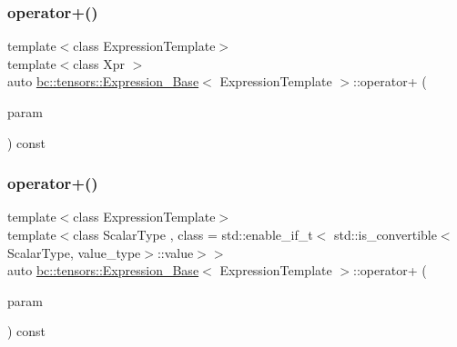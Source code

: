 \subsubsection{\texorpdfstring{operator+()}{operator+()}\hspace{0.1cm}{\footnotesize\ttfamily [1/2]}}
{\footnotesize\ttfamily template$<$class Expression\+Template$>$ \\
template$<$class Xpr $>$ \\
auto \hyperlink{classbc_1_1tensors_1_1Expression__Base}{bc\+::tensors\+::\+Expression\+\_\+\+Base}$<$ Expression\+Template $>$\+::operator+ (\begin{DoxyParamCaption}\item[{const \hyperlink{classbc_1_1tensors_1_1Expression__Base}{Expression\+\_\+\+Base}$<$ Xpr $>$ \&}]{param }\end{DoxyParamCaption}) const\hspace{0.3cm}{\ttfamily [inline]}}

\mbox{\label{classbc_1_1tensors_1_1Expression__Base_a2b29585ec1eab54f5406da087ba5565c}} 
\subsubsection{\texorpdfstring{operator+()}{operator+()}\hspace{0.1cm}{\footnotesize\ttfamily [2/2]}}
{\footnotesize\ttfamily template$<$class Expression\+Template$>$ \\
template$<$class Scalar\+Type , class  = std\+::enable\+\_\+if\+\_\+t$<$   std\+::is\+\_\+convertible$<$\+Scalar\+Type, value\+\_\+type$>$\+::value$>$$>$ \\
auto \hyperlink{classbc_1_1tensors_1_1Expression__Base}{bc\+::tensors\+::\+Expression\+\_\+\+Base}$<$ Expression\+Template $>$\+::operator+ (\begin{DoxyParamCaption}\item[{const Scalar\+Type \&}]{param }\end{DoxyParamCaption}) const\hspace{0.3cm}{\ttfamily [inline]}}

\mbox{\label{classbc_1_1tensors_1_1Expression__Base_a2d0ab75e1b0693e484741721309731a6}} 
